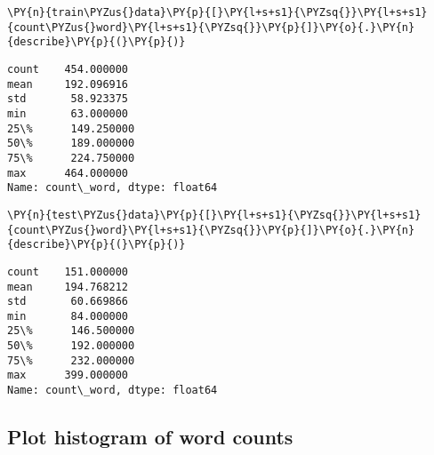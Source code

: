 \documentclass[../main.tex]{subfiles}
\begin{document}
    \begin{tcolorbox}[breakable, size=fbox, boxrule=1pt, pad at break*=1mm,colback=cellbackground, colframe=cellborder]
\begin{Verbatim}[commandchars=\\\{\}]
\PY{n}{train\PYZus{}data}\PY{p}{[}\PY{l+s+s1}{\PYZsq{}}\PY{l+s+s1}{count\PYZus{}word}\PY{l+s+s1}{\PYZsq{}}\PY{p}{]}\PY{o}{.}\PY{n}{describe}\PY{p}{(}\PY{p}{)}
\end{Verbatim}
\end{tcolorbox}

            \begin{tcolorbox}[breakable, size=fbox, boxrule=.5pt, pad at break*=1mm, opacityfill=0]
\begin{Verbatim}[commandchars=\\\{\}]
count    454.000000
mean     192.096916
std       58.923375
min       63.000000
25\%      149.250000
50\%      189.000000
75\%      224.750000
max      464.000000
Name: count\_word, dtype: float64
\end{Verbatim}
\end{tcolorbox}
        
    \begin{tcolorbox}[breakable, size=fbox, boxrule=1pt, pad at break*=1mm,colback=cellbackground, colframe=cellborder]
\begin{Verbatim}[commandchars=\\\{\}]
\PY{n}{test\PYZus{}data}\PY{p}{[}\PY{l+s+s1}{\PYZsq{}}\PY{l+s+s1}{count\PYZus{}word}\PY{l+s+s1}{\PYZsq{}}\PY{p}{]}\PY{o}{.}\PY{n}{describe}\PY{p}{(}\PY{p}{)}
\end{Verbatim}
\end{tcolorbox}

            \begin{tcolorbox}[breakable, size=fbox, boxrule=.5pt, pad at break*=1mm, opacityfill=0]
\begin{Verbatim}[commandchars=\\\{\}]
count    151.000000
mean     194.768212
std       60.669866
min       84.000000
25\%      146.500000
50\%      192.000000
75\%      232.000000
max      399.000000
Name: count\_word, dtype: float64
\end{Verbatim}
\end{tcolorbox}
        
    \subsection{Plot histogram of word counts}\label{plot-histogram-of-word-counts}
\end{document}
